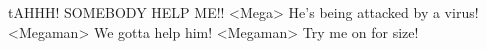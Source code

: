 tAHHH! SOMEBODY HELP ME!! 
<Mega> He's being attacked by a virus! 
<Megaman> We gotta help him! 
<Megaman> Try me on for size! 
